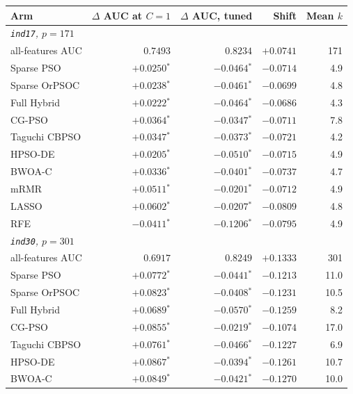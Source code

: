 \begin{table}[htbp]
    \centering
    \small\setlength{\tabcolsep}{5pt}
    \begin{tabular}{lrrrr}
    \hline
    Arm & $\Delta$ AUC at $C = 1$ & $\Delta$ AUC, tuned & Shift & Mean $k$ \\
    \hline
    \multicolumn{5}{l}{\textit{\texttt{ind17}, $p = 171$}} \\
    all-features AUC & $0.7493$ & $0.8234$ & $+0.0741$ & 171 \\
    Sparse PSO & $+0.0250$$^{*}$ & $-0.0464$$^{*}$ & $-0.0714$ & 4.9 \\
    Sparse OrPSOC & $+0.0238$$^{*}$ & $-0.0461$$^{*}$ & $-0.0699$ & 4.8 \\
    Full Hybrid & $+0.0222$$^{*}$ & $-0.0464$$^{*}$ & $-0.0686$ & 4.3 \\
    CG-PSO & $+0.0364$$^{*}$ & $-0.0347$$^{*}$ & $-0.0711$ & 7.8 \\
    Taguchi CBPSO & $+0.0347$$^{*}$ & $-0.0373$$^{*}$ & $-0.0721$ & 4.2 \\
    HPSO-DE & $+0.0205$$^{*}$ & $-0.0510$$^{*}$ & $-0.0715$ & 4.9 \\
    BWOA-C & $+0.0336$$^{*}$ & $-0.0401$$^{*}$ & $-0.0737$ & 4.7 \\
    mRMR & $+0.0511$$^{*}$ & $-0.0201$$^{*}$ & $-0.0712$ & 4.9 \\
    LASSO & $+0.0602$$^{*}$ & $-0.0207$$^{*}$ & $-0.0809$ & 4.8 \\
    RFE & $-0.0411$$^{*}$ & $-0.1206$$^{*}$ & $-0.0795$ & 4.9 \\
    \hline
    \multicolumn{5}{l}{\textit{\texttt{ind30}, $p = 301$}} \\
    all-features AUC & $0.6917$ & $0.8249$ & $+0.1333$ & 301 \\
    Sparse PSO & $+0.0772$$^{*}$ & $-0.0441$$^{*}$ & $-0.1213$ & 11.0 \\
    Sparse OrPSOC & $+0.0823$$^{*}$ & $-0.0408$$^{*}$ & $-0.1231$ & 10.5 \\
    Full Hybrid & $+0.0689$$^{*}$ & $-0.0570$$^{*}$ & $-0.1259$ & 8.2 \\
    CG-PSO & $+0.0855$$^{*}$ & $-0.0219$$^{*}$ & $-0.1074$ & 17.0 \\
    Taguchi CBPSO & $+0.0761$$^{*}$ & $-0.0466$$^{*}$ & $-0.1227$ & 6.9 \\
    HPSO-DE & $+0.0867$$^{*}$ & $-0.0394$$^{*}$ & $-0.1261$ & 10.7 \\
    BWOA-C & $+0.0849$$^{*}$ & $-0.0421$$^{*}$ & $-0.1270$ & 10.0 \\

\end{tabular}
\end{table}
